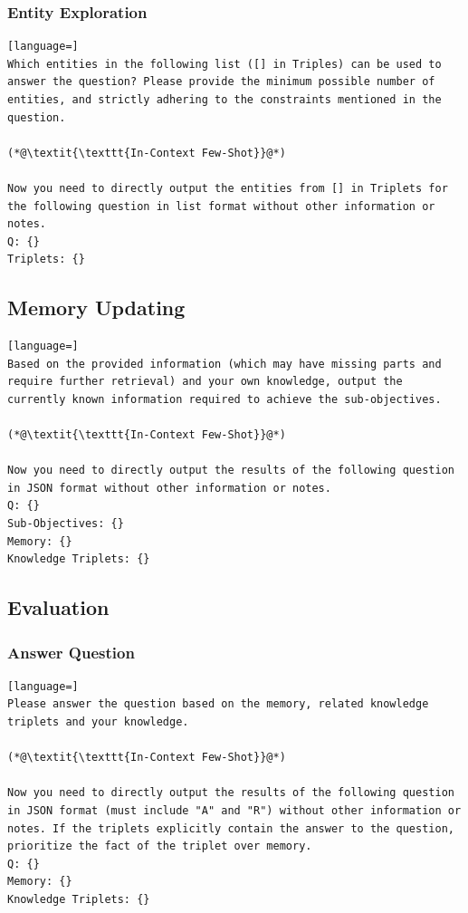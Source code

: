 \documentclass{article}
\begin{document}
\subsubsection{Entity Exploration}
\label{prompt:ee}
\begin{lstlisting}[language=]
Which entities in the following list ([] in Triples) can be used to answer the question? Please provide the minimum possible number of entities, and strictly adhering to the constraints mentioned in the question. 

(*@\textit{\texttt{In-Context Few-Shot}}@*)

Now you need to directly output the entities from [] in Triplets for the following question in list format without other information or notes.
Q: {}
Triplets: {}
\end{lstlisting}
\subsection{Memory Updating}
\label{prompt:mu}
\begin{lstlisting}[language=]
Based on the provided information (which may have missing parts and require further retrieval) and your own knowledge, output the currently known information required to achieve the sub-objectives.

(*@\textit{\texttt{In-Context Few-Shot}}@*)

Now you need to directly output the results of the following question in JSON format without other information or notes. 
Q: {}
Sub-Objectives: {}
Memory: {}
Knowledge Triplets: {}
\end{lstlisting}
\subsection{Evaluation}
\subsubsection{Answer Question}
\label{prompt:aq}
\begin{lstlisting}[language=]
Please answer the question based on the memory, related knowledge triplets and your knowledge.

(*@\textit{\texttt{In-Context Few-Shot}}@*)

Now you need to directly output the results of the following question in JSON format (must include "A" and "R") without other information or notes. If the triplets explicitly contain the answer to the question, prioritize the fact of the triplet over memory.
Q: {}
Memory: {}
Knowledge Triplets: {}
\end{lstlisting}
\end{document}
